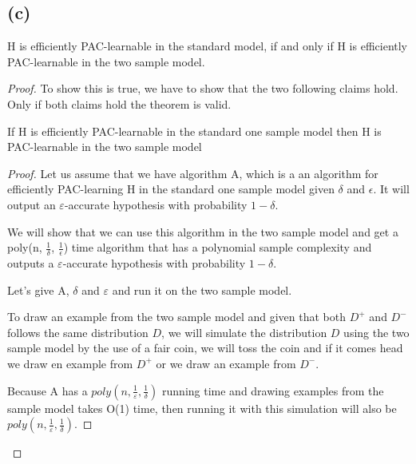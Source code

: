 \documentclass[]{homework}
\begin{document}
\subsection*{(c)} 
\begin{theorem}
H is efficiently PAC-learnable in the standard model, if and only if H is efficiently PAC-learnable in the two sample model.
\end{theorem}
\begin{proof}
To show this is true, we have to show that the two following claims hold. Only if both claims hold the theorem is valid.
\begin{claim}
If H is efficiently PAC-learnable in the standard one sample model then H is PAC-learnable in the two sample model
\end{claim}
\begin{proof}
Let us assume that we have algorithm A, which is a an algorithm for efficiently PAC-learning H in the standard one sample model given $\delta$ and $\epsilon$. It will output an $\varepsilon$-accurate hypothesis with probability $1-\delta$. 

We will show that we can use this algorithm in the two sample model and get a poly(n, $\frac{1}{\delta}$, $\frac{1}{\epsilon}$) time algorithm that has a polynomial sample complexity and outputs a $\varepsilon$-accurate hypothesis with probability $1-\delta$. 

Let's give A, $\delta$ and $\varepsilon$ and run it on the two sample model. 

To draw an example from the two sample model and given that both $D^+$ and $D^-$ follows the same distribution $D$, we will simulate the distribution $D$ using the two sample model by the use of a fair coin, we will toss the coin and if it comes head we draw en example from $D^+$ or we draw an example from $D^-$.

Because A has a $poly(n, \frac{1}{\varepsilon},\frac{1}{\delta})$ running time and drawing examples from the sample model takes O(1) time, then running it with this simulation will also be $poly(n, \frac{1}{\varepsilon},\frac{1}{\delta})$.


\end{proof}
\end{proof}
\end{document}
